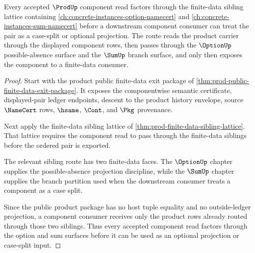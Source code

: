 \begin{theorem}
\label{thm:prod-option-sum-component-sibling-route}
Every accepted $\ProdUp$ component read factors through the finite-data sibling lattice containing \autoref{ch:concrete-instances-option-namecert} and \autoref{ch:concrete-instances-sum-namecert} before a downstream component consumer can treat the pair as a case-split or optional projection. The route reads the product carrier through the displayed component rows, then passes through the $\OptionUp$ possible-absence surface and the $\SumUp$ branch surface, and only then exposes the component to a finite-data consumer.
\end{theorem}
\begin{proof}
Start with the product public finite-data exit package of \autoref{thm:prod-public-finite-data-exit-package}. It exposes the componentwise semantic certificate, displayed-pair ledger endpoints, descent to the product history envelope, source $\NameCert$ rows, $\hsame$, $\Cont$, and $\Pkg$ provenance.

Next apply the finite-data sibling lattice of \autoref{thm:prod-finite-data-sibling-lattice}. That lattice requires the component read to pass through the finite-data siblings before the ordered pair is exported.

The relevant sibling route has two finite-data faces. The $\OptionUp$ chapter supplies the possible-absence projection discipline, while the $\SumUp$ chapter supplies the branch partition used when the downstream consumer treats a component as a case split.

Since the public product package has no host tuple equality and no outside-ledger projection, a component consumer receives only the product rows already routed through those two siblings. Thus every accepted component read factors through the option and sum surfaces before it can be used as an optional projection or case-split input.
\end{proof}
